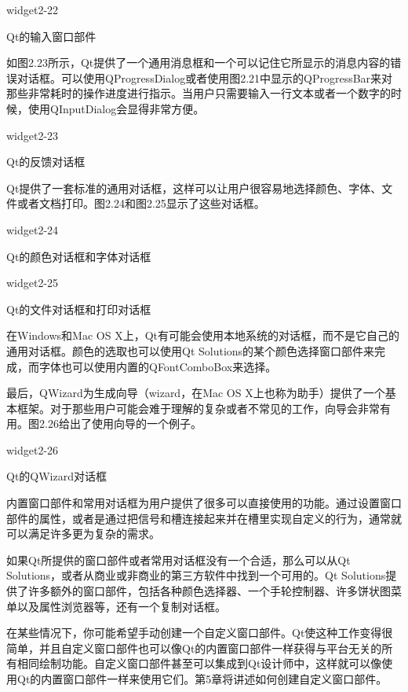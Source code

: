 \documentclass[11pt,oneside]{book}
\begin{document}
\begin{common-format}
\begin{linefig}[0.8]{widget2-22}
\caption{Qt的输入窗口部件}
\label{fig:widget2-22}
\end{linefig}

如图2.23所示，Qt提供了一个通用消息框和一个可以记住它所显示的消息内容的错误对话框。可以使用QProgressDialog或者使用图2.21中显示的QProgressBar来对那些非常耗时的操作进度进行指示。当用户只需要输入一行文本或者一个数字的时候，使用QInputDialog会显得非常方便。

\begin{linefig}[0.8]{widget2-23}
\caption{Qt的反馈对话框}
\label{fig:widget2-23}
\end{linefig}

Qt提供了一套标准的通用对话框，这样可以让用户很容易地选择颜色、字体、文件或者文档打印。图2.24和图2.25显示了这些对话框。
\begin{linefig}[0.8]{widget2-24}
\caption{Qt的颜色对话框和字体对话框}
\label{fig:widget2-24}
\end{linefig}

\begin{linefig}[0.8]{widget2-25}
\caption{Qt的文件对话框和打印对话框}
\label{fig:widget2-25}
\end{linefig}

在Windows和Mac OS X上，Qt有可能会使用本地系统的对话框，而不是它自己的通用对话框。颜色的选取也可以使用Qt Solutions的某个颜色选择窗口部件来完成，而字体也可以使用内置的QFontComboBox来选择。

最后，QWizard为生成向导（wizard，在Mac OS X上也称为助手）提供了一个基本框架。对于那些用户可能会难于理解的复杂或者不常见的工作，向导会非常有用。图2.26给出了使用向导的一个例子。

\begin{linefig}[0.8]{widget2-26}
\caption{Qt的QWizard对话框}
\label{fig:widget2-26}
\end{linefig}

内置窗口部件和常用对话框为用户提供了很多可以直接使用的功能。通过设置窗口部件的属性，或者是通过把信号和槽连接起来并在槽里实现自定义的行为，通常就可以满足许多更为复杂的需求。

如果Qt所提供的窗口部件或者常用对话框没有一个合适，那么可以从Qt Solutions，或者从商业或非商业的第三方软件中找到一个可用的。Qt Solutions提供了许多额外的窗口部件，包括各种颜色选择器、一个手轮控制器、许多饼状图菜单以及属性浏览器等，还有一个复制对话框。

在某些情况下，你可能希望手动创建一个自定义窗口部件。Qt使这种工作变得很简单，并且自定义窗口部件也可以像Qt的内置窗口部件一样获得与平台无关的所有相同绘制功能。自定义窗口部件甚至可以集成到Qt设计师中，这样就可以像使用Qt的内置窗口部件一样来使用它们。第5章将讲述如何创建自定义窗口部件。



\end{common-format}
\end{document}

